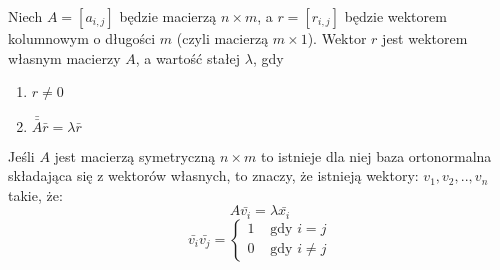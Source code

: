 \begin{definition}
Niech $A=[a_{i,j}]$ będzie macierzą $n\times m$, a $r=[r_{i,j}]$ będzie wektorem kolumnowym o długości $m$ (czyli macierzą $m\times 1$). Wektor $r$ jest wektorem własnym macierzy $A$, a wartość stałej $\lambda $, gdy
\begin{enumerate}
\item $r\neq 0$
\item $ \bar{\bar{A}}\bar{r}=\lambda \bar{r}$
\end{enumerate}
\end{definition}

\begin{theorem}
Jeśli $A$ jest macierzą symetryczną $n\times m$ to istnieje dla niej baza ortonormalna składająca się z wektorów własnych, to znaczy, że istnieją wektory: $v_1,v_2,..,v_n$ takie, że:
$$A\bar{v_i}=\lambda \bar{x_i}$$
$$\bar{v_i}\bar{v_j}=\left\{\begin{matrix}
1 &\text{ gdy }i=j\\
0&\text{ gdy } i\neq j 
\end{matrix}\right.$$
\end{theorem}

